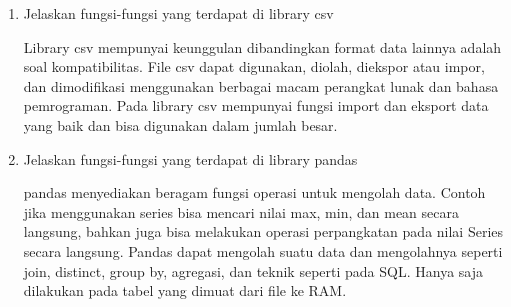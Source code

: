 \begin{enumerate}
    \item Jelaskan fungsi-fungsi yang terdapat di library csv
    \par Library csv mempunyai keunggulan dibandingkan format data lainnya adalah soal kompatibilitas. File csv dapat digunakan, diolah, diekspor atau impor, dan dimodifikasi menggunakan berbagai macam perangkat lunak dan bahasa pemrograman. Pada library csv mempunyai fungsi import dan eksport data yang baik dan bisa digunakan dalam jumlah besar.
    
    \item Jelaskan fungsi-fungsi yang terdapat di library pandas
    \par pandas menyediakan beragam fungsi operasi untuk mengolah data. Contoh jika menggunakan series bisa mencari nilai max, min, dan mean secara langsung, bahkan juga bisa melakukan operasi perpangkatan pada nilai Series secara langsung. Pandas dapat mengolah suatu data dan mengolahnya seperti join, distinct, group by, agregasi, dan teknik seperti pada SQL. Hanya saja dilakukan pada tabel yang dimuat dari file ke RAM.
\end{enumerate}

